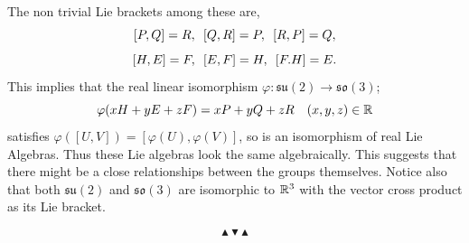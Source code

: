 The non trivial Lie brackets among these are,
\[ [P,Q]=R,\hspace{5px}[Q,R]=P,\hspace{5px}[R,P]=Q, \]
\[ [H,E]=F,\hspace{5px}[E,F]=H,\hspace{5px}[F.H]=E. \]
This implies that the real linear isomorphism \(\varphi:\mathfrak{su}(2)\longrightarrow\mathfrak{so}(3)\);
\[ \varphi(xH+yE+zF)=xP+yQ+zR \hspace{10px} (x,y,z)\in\R \]
satisfies \(\varphi([U,V])=[\varphi(U),\varphi(V)]\), so is an isomorphism of real Lie Algebras.
Thus these Lie algebras look the same algebraically. This suggests that there might be a
close relationships between the groups themselves. Notice also that both \(\mathfrak{su}(2)\)
and \(\mathfrak{so}(3)\) are isomorphic to \(\mathbb{R}^3\) with the vector cross product as its
Lie bracket.

\[ \blacktriangle \blacktriangledown \blacktriangle \]
